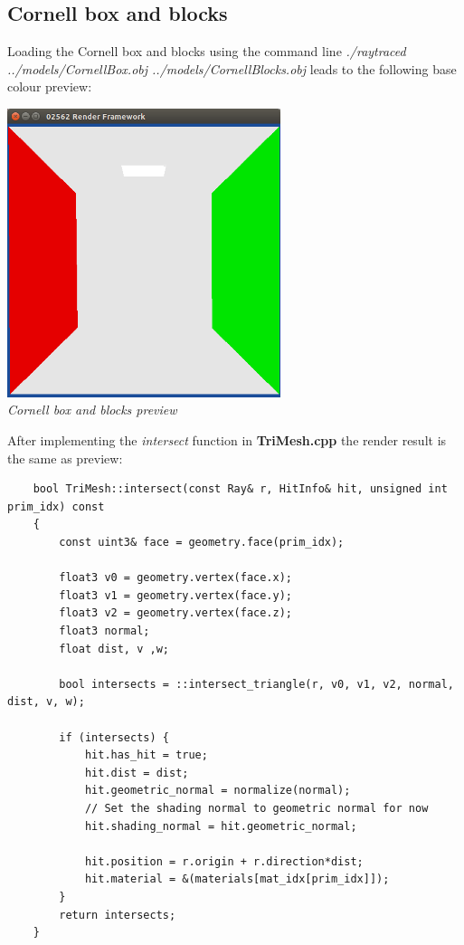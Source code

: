 \documentclass[a4,12pt]{article}
\begin{document}
	\subsection{Cornell box and blocks}
	Loading the Cornell box and blocks using the command line \textit{./raytraced ../models/CornellBox.obj ../models/CornellBlocks.obj} leads to the following base colour preview:
	\begin{center}
		\includegraphics[width=8cm]{./Worksheet4/CornellBasePreview}\\
		\textit{Cornell box and blocks preview}
	\end{center}
	
	After implementing the \textit{intersect} function in \textbf{TriMesh.cpp} the render result is the same as preview:
	\begin{lstlisting}
	bool TriMesh::intersect(const Ray& r, HitInfo& hit, unsigned int prim_idx) const
	{
		const uint3& face = geometry.face(prim_idx);
		
		float3 v0 = geometry.vertex(face.x);
		float3 v1 = geometry.vertex(face.y);
		float3 v2 = geometry.vertex(face.z);
		float3 normal;
		float dist, v ,w;

		bool intersects = ::intersect_triangle(r, v0, v1, v2, normal, dist, v, w);
		
		if (intersects) {
			hit.has_hit = true;
			hit.dist = dist;
			hit.geometric_normal = normalize(normal);
			// Set the shading normal to geometric normal for now
			hit.shading_normal = hit.geometric_normal;
			
			hit.position = r.origin + r.direction*dist;
			hit.material = &(materials[mat_idx[prim_idx]]);
		}
		return intersects;
	}
	\end{lstlisting}
	
\end{document}
